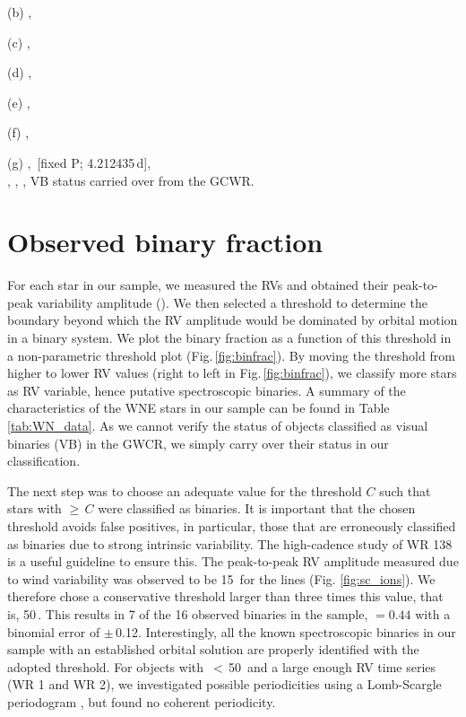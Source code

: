 \begin{table}
\begin{threeparttable}
\begin{tablenotes}
    \item[(b)] \citet{2020Koenigsberger},
    \item[(c)] \citet{2011delachevrotiere},\\
    \item[(d)] \citet{2021Richardson},
    \item[(e)] \citet{2016Richardson},
    \item[(f)] \citet{2013Palate},
    \item[(g)] \citet{1990Annuk},
     \citet{1994Marchenko}\,[fixed P; 4.212435\,d],\\
     \citet{1998Marchenko1998WR141},
     \citet{2009HuttonWR151}, 
     \citet{2021MaizAppelaniz}, 
     VB status carried over from the GCWR.
\end{tablenotes}
\end{threeparttable}
\label{tab:WN_data}
\end{table}


\section{Observed binary fraction}\label{sect:results_WNE}

For each star in our sample, we measured the RVs and obtained their peak-to-peak variability amplitude (\DelRV{}). We then selected a threshold to determine the boundary beyond which the RV amplitude would be dominated by orbital motion in a binary system. We plot the binary fraction as a function of this threshold in a non-parametric threshold plot (Fig.\,\ref{fig:binfrac}). By moving the threshold from higher to lower RV values (right to left in Fig.\,\ref{fig:binfrac}), we classify more stars as RV variable, hence putative spectroscopic binaries. A summary of the characteristics of the WNE stars in our sample can be found in Table \ref{tab:WN_data}. As we cannot verify the status of objects classified as visual binaries (VB) in the GWCR, we simply carry over their status in our classification.

The next step was to choose an adequate value for the threshold $C$ such that stars with \DelRV{}$\ge$\,$C$ were classified as binaries. It is important that the chosen threshold avoids false positives, in particular, those that are erroneously classified as binaries due to strong intrinsic variability. The high-cadence study of WR 138 is a useful guideline to ensure this. The peak-to-peak RV amplitude measured due to wind variability was observed to be 15\,\kms{} for the \nv{} lines (Fig. \ref{fig:sc_ions}). We therefore chose a conservative threshold larger than three times this value, that is, 50\,\kms{}. This results in 7 of the 16 observed binaries in the sample, \fobsWNE{} $= 0.44$ with a binomial error of $\pm$\,0.12. Interestingly, all the known spectroscopic binaries in our sample with an established orbital solution are properly identified with the adopted threshold. For objects with \DelRV{}\,$<$\,50\,\kms{} and a large enough RV time series (WR 1 and WR 2), we investigated possible periodicities using a Lomb-Scargle periodogram \citep{1976Lomb,1982Scargle}, but found no coherent periodicity.


